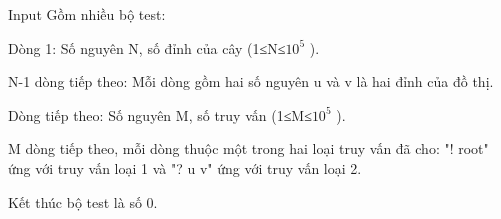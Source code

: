 Input
Gồm nhiều bộ test:  

   Dòng 1: Số nguyên N, số đỉnh của cây (1≤N≤$10^{5}$   ).  

   N-1 dòng tiếp theo: Mỗi dòng gồm hai số nguyên u và v là hai đỉnh của đồ thị.  

   Dòng tiếp theo: Số nguyên M, số truy vấn (1≤M≤$10^{5}$   ).  

   M dòng tiếp theo, mỗi dòng thuộc một trong hai loại truy vấn đã cho: "! root" ứng với truy vấn loại 1 và "? u v" ứng với truy vấn loại 2.  

   Kết thúc bộ test là số 0.